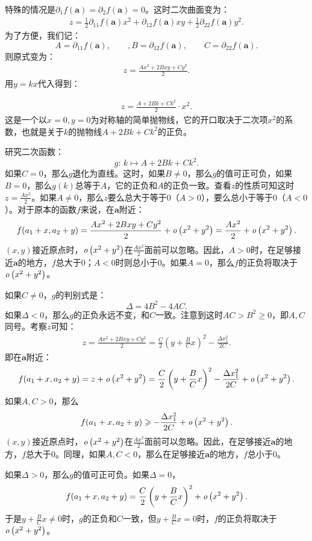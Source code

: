 \documentclass[12pt,UTF8]{ctexbook}
\begin{document}
特殊的情况是$\partial_1 f(\mathbf{a}) = \partial_2 f(\mathbf{a}) = 0$。这时二次曲面变为：
\begin{align*}
    z = \frac{1}{2} \partial_{11} f(\mathbf{a})x^2 + \partial_{12} f(\mathbf{a})xy + \frac{1}{2}\partial_{22} f(\mathbf{a})y^2.
\end{align*}
为了方便，我们记：
$$ A = \partial_{11} f(\mathbf{a}),\qquad , B = \partial_{12} f(\mathbf{a}), \qquad C = \partial_{22} f(\mathbf{a}). $$
则原式变为：
\begin{align*}
    z = \frac{Ax^2 + 2Bxy+Cy^2}{2}.
\end{align*}
用$y = kx$代入得到：

\begin{align*}
    z = \frac{A + 2Bk+Ck^2}{2}\cdot x^2.
\end{align*}
这是一个以$x=0,y=0$为对称轴的简单抛物线，它的开口取决于二次项$x^2$的系数，也就是关于$k$的抛物线$A + 2Bk+Ck^2$的正负。

研究二次函数：
$$ g: \, k \mapsto A + 2Bk+Ck^2.$$
如果$C = 0$，那么$g$退化为直线。这时，如果$B\neq 0$，那么$g$的值可正可负，如果$B=0$，那么$g(k)$总等于$A$，它的正负和$A$的正负一致。查看$z$的性质可知这时$z = \frac{Ax^2}{2}$。如果$A\neq 0$，那么$z$要么总大于等于$0$（$A>0$），要么总小于等于$0$（$A<0$）。对于原本的函数$f$来说，在$\mathbf{a}$附近：
$$ f(a_1+x,a_2+y) = \frac{Ax^2 + 2Bxy+Cy^2}{2} + \mathit{o}\left(x^2+y^2\right) = \frac{Ax^2}{2} + \mathit{o}\left(x^2+y^2\right). $$
$(x,y)$接近原点时，$\mathit{o}\left(x^2+y^2\right)$在$\frac{Ax^2}{2}$面前可以忽略。因此，$A>0$时，在足够接近$\mathbf{a}$的地方，$f$总大于$0$；$A<0$时则总小于$0$。如果$A=0$，那么$f$的正负将取决于$\mathit{o}\left(x^2+y^2\right)$。

如果$C\neq 0$，$g$的判别式是：
$$ \Delta = 4B^2 - 4AC.$$
如果$\Delta < 0$，那么$g$的正负永远不变，和$C$一致。注意到这时$AC>B^2\geqslant 0$，即$A,C$同号。考察$z$可知：
\begin{align*}
    z = \frac{Ax^2 + 2Bxy+Cy^2}{2} = \frac{C}{2}\left(y + \frac{B}{C}x\right)^2 - \frac{\Delta x_1^2}{2C}.
\end{align*}
即在$\mathbf{a}$附近：
$$ f(a_1+x,a_2+y) = z + \mathit{o}\left(x^2+y^2\right) = \frac{C}{2}\left(y + \frac{B}{C}x\right)^2 - \frac{\Delta x_1^2}{2C} + \mathit{o}\left(x^2+y^2\right). $$
如果$A,C>0$，那么
$$ f(a_1+x,a_2+y) \geqslant - \frac{\Delta x_1^2}{2C} + \mathit{o}\left(x^2+y^2\right). $$
$(x,y)$接近原点时，$\mathit{o}\left(x^2+y^2\right)$在$\frac{Ax^2}{2}$面前可以忽略。因此，在足够接近$\mathbf{a}$的地方，$f$总大于$0$。同理，如果$A,C<0$，那么在足够接近$\mathbf{a}$的地方，$f$总小于$0$。

如果$\Delta > 0$，那么$g$的值可正可负。如果$\Delta=0$，
$$ f(a_1+x,a_2+y) = \frac{C}{2}\left(y + \frac{B}{C}x\right)^2 + \mathit{o}\left(x^2+y^2\right). $$
于是$y + \frac{B}{C}x \neq 0$时，$g$的正负和$C$一致，但$y + \frac{B}{C}x = 0$时，$f$的正负将取决于$\mathit{o}\left(x^2+y^2\right)$。
\end{document}
